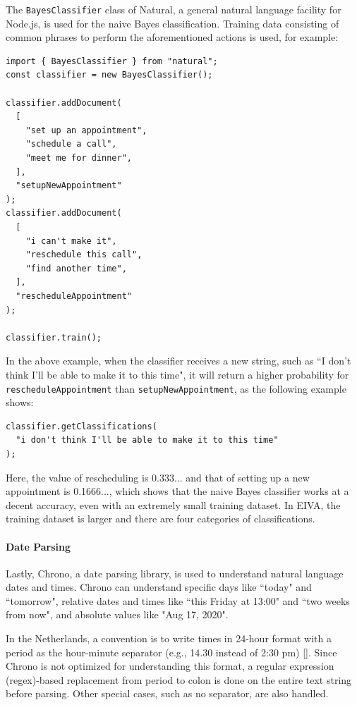 \documentclass{article}
\begin{document}
The \texttt{BayesClassifier} class of Natural, a general natural language facility for Node.js, is used for the naive Bayes classification. Training data consisting of common phrases to perform the aforementioned actions is used, for example:

\begin{verbatim}
import { BayesClassifier } from "natural";
const classifier = new BayesClassifier();

classifier.addDocument(
  [
    "set up an appointment",
    "schedule a call",
    "meet me for dinner",
  ],
  "setupNewAppointment"
);
classifier.addDocument(
  [
    "i can't make it",
    "reschedule this call",
    "find another time",
  ],
  "rescheduleAppointment"
);

classifier.train();
\end{verbatim}

In the above example, when the classifier receives a new string, such as ``I don't think I'll be able to make it to this time", it will return a higher probability for \texttt{rescheduleAppointment} than \texttt{setupNewAppointment}, as the following example shows:

\begin{verbatim}
classifier.getClassifications(
  "i don't think I'll be able to make it to this time"
);
\end{verbatim}

Here, the value of rescheduling is 0.333... and that of setting up a new appointment is 0.1666..., which shows that the naive Bayes classifier works at a decent accuracy, even with an extremely small training dataset. In EIVA, the training dataset is larger and there are four categories of classifications.

\paragraph{Date Parsing}

Lastly, Chrono, a date parsing library, is used to understand natural language dates and times. Chrono can understand specific days like ``today" and ``tomorrow", relative dates and times like ``this Friday at 13:00" and ``two weeks from now", and absolute values like "Aug 17, 2020".

In the Netherlands, a convention is to write times in 24-hour format with a period as the hour-minute separator (e.g., 14.30 instead of 2:30 pm) []. Since Chrono is not optimized for understanding this format, a regular expression (regex)-based replacement from period to colon is done on the entire text string before parsing. Other special cases, such as no separator, are also handled.
\end{document}
